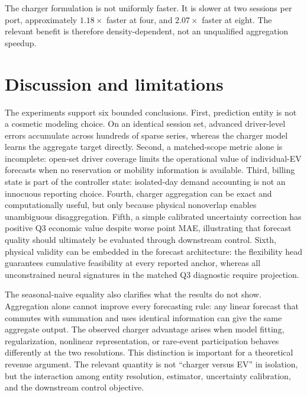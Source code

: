 \documentclass[11pt]{article}
\begin{document}
The charger formulation is not uniformly faster.  It is slower at two sessions
per port, approximately \(1.18\times\) faster at four, and \(2.07\times\)
faster at eight.  The relevant benefit is therefore density-dependent, not an
unqualified aggregation speedup.

\clearpage
\section{Discussion and limitations}

The experiments support six bounded conclusions.  First, prediction entity is
not a cosmetic modeling choice.  On an identical session set, advanced
driver-level errors accumulate across hundreds of sparse series, whereas the
charger model learns the aggregate target directly.  Second, a matched-scope
metric alone is incomplete: open-set driver coverage limits the operational
value of individual-EV forecasts when no reservation or mobility information
is available.  Third, billing state is part of the controller state:
isolated-day demand accounting is not an innocuous reporting choice.  Fourth,
charger aggregation can be exact and computationally useful, but only because
physical nonoverlap enables unambiguous disaggregation.  Fifth, a simple
calibrated uncertainty correction has positive Q3 economic value despite worse
point MAE, illustrating that forecast quality should ultimately be evaluated
through downstream control.  Sixth, physical validity can be embedded in the
forecast architecture: the flexibility head guarantees cumulative feasibility
at every reported anchor, whereas all unconstrained neural signatures in the
matched Q3 diagnostic require projection.

The seasonal-naive equality also clarifies what the results do not show.
Aggregation alone cannot improve every forecasting rule: any linear forecast
that commutes with summation and uses identical information can give the same
aggregate output.  The observed charger advantage arises when model fitting,
regularization, nonlinear representation, or rare-event participation behaves
differently at the two resolutions.  This distinction is important for a
theoretical revenue argument.  The relevant quantity is not ``charger versus
EV'' in isolation, but the interaction among entity resolution, estimator,
uncertainty calibration, and the downstream control objective.
\end{document}
